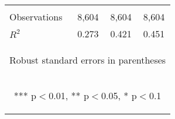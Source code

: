 \begin{center}
\begin{tabular}{lccc}
\vspace{4pt} & \begin{footnotesize}\end{footnotesize} & \begin{footnotesize}\end{footnotesize} & \begin{footnotesize}\end{footnotesize} \\
Observations & 8,604 & 8,604 & 8,604 \\
 $R^2$ & 0.273 & 0.421 & 0.451 \\ \hline
\multicolumn{4}{c}{\begin{footnotesize} Robust standard errors in parentheses\end{footnotesize}} \\
\multicolumn{4}{c}{\begin{footnotesize} *** p$<$0.01, ** p$<$0.05, * p$<$0.1\end{footnotesize}} \\
\end{tabular}
\end{center}
